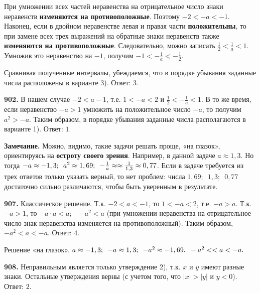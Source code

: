 При умножении всех частей неравенства на отрицательное число знаки неравенств \textbf{изменяются на противоположные}. Поэтому $-2<-a<-1$.     
Наконец, если в двойном неравенстве левая и правая части \textbf{положительны}, то при замене всех трех выражений на обратные знаки неравенств также  \textbf{изменяются на противоположные}. Следовательно, можно записать $\frac{1}{2}<\frac{1}{a}<1$. Умножив это неравенство на $-1$, получим $-1<-\frac{1}{a}<-\frac{1}{2}$.

Сравнивая полученные интервалы, убеждаемся, что  в порядке убывания заданные числа расположены в варианте  3). \newline \null \hspace*{\fill} Ответ: $3$. 

\newpage \textbf{902.} В нашем случае $-2<a-1$, т.е. $1<-a<2$ и $\frac{1}{2}<-\frac{1}{a}<1$. В то же время, если неравенство $-a>1$ умножить на положительное число $-a$, то получим $a^2>-a$. Таким образом, в порядке убывания заданные числа располагаются в варианте 1). \newline \null \hspace*{\fill} Ответ: $1$.

\textbf{Замечание.} Можно, видимо, такие задачи решать проще,  «на глазок», ориентируясь на \textbf{остроту своего зрения}. Например, в данной задаче $a\approx1,3$. Но тогда $-a\approx-1,3;\enspace a^2\approx 1,69;\enspace -\frac{1}{a}\approx\linebreak\approx\frac{1}{1,3}\approx0,77$. Если в задаче требуется из трех ответов только указать верный, то нет проблем:  числа $1,69;\enspace1,3;\enspace0,77$ достаточно сильно различаются, чтобы быть уверенным в результате.

\textbf{907.} Классическое решение. Т.к. $-2<a<-1$, то $1<-a<2$, т.е. $-a>a$. Т.к. $-a>1$, то $-a\cdot a<a;\enspace -a^2<a$ (при умножении неравенства на отрицательное число знак неравенства изменяется на противоположный). Таким образом, $-a^2<a<-a$. \newline \null \hspace*{\fill} Ответ: $4$.

Решение «на глазок». $a\approx-1,3;\enspace -a\approx1,3;\enspace -a^2\approx-1,69.\enspace -a^2<\linebreak<a<-a.$

\textbf{908.} Неправильным является только утверждение 2), т.к. $x$ и $y$ имеют разные знаки. Остальные утверждения верны (с учетом того, что $|x|>|y|$ и $y<0$). \newline \null \hspace*{\fill} Ответ: $2$.

